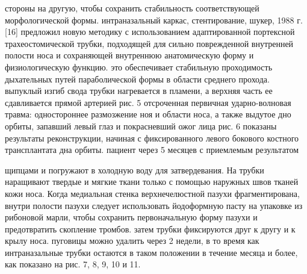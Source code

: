 стороны на другую, чтобы сохранить стабильность соответствующей морфологической
формы. интраназальный каркас, стентирование, шукер, 1988 г. [16] предложил новую
методику с использованием адаптированной портексной трахеостомической трубки,
подходящей для сильно поврежденной внутренней полости носа и сохраняющей
внутреннюю анатомическую форму и физиологическую функцию. это обеспечивает
стабильную проходимость дыхательных путей параболической формы в области
среднего прохода. выпуклый изгиб свода трубки нагревается в пламени, а верхняя
часть ее сдавливается прямой артерией рис. 5 отсроченная первичная
ударно-волновая травма: одностороннее размозжение ноя и области носа, а также
выдутое дно орбиты, запавший левый глаз и покрасневший ожог лица рис. 6 показаны
результаты реконструкции, начиная с фиксированного левого бокового костного
трансплантата дна орбиты. пациент через 5 месяцев с приемлемым результатом

щипцами и погружают в холодную воду для затвердевания. На трубки наращивают
твердые и мягкие ткани только с помощью наружных швов тканей кожи носа. Когда
медиальная стенка верхнечелюстной пазухи фрагментирована, внутри полости пазухи
следует использовать йодоформную пасту на упаковке из рибоновой марли, чтобы
сохранить первоначальную форму пазухи и предотвратить скопление тромбов. затем
трубки фиксируются друг к другу и к крылу носа. пуговицы можно удалить через 2
недели, в то время как интраназальные трубки остаются в таком положении в
течение месяца и более, как показано на рис. 7, 8, 9, 10 и 11.

